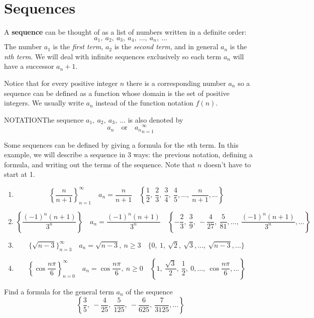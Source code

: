 \section{Sequences}
  A \textbf{sequence} can be thought of as a list of numbers written in a definite order:
  $$a_1,\ a_2,\ a_3,\ a_4,\ \ldots,\ a_n,\ \ldots$$
  The number $a_1$ is the \textit{first term}, $a_2$ is the \textit{second term}, and in general $a_n$ is the \textit{nth term}. We will deal with infinite sequences exclusively so each term $a_n$ will have a successor $a_n+1$.\par
  Notice that for every positive integer $n$ there is a corresponding number $a_n$ so a sequence can be defined as a function whose domain is the set of positive integers. We usually write $a_n$ instead of the function notation $f(n)$.
  \begin{center}
  \uppercase{Notation}\quad The sequence ${a_1,\ a_2,\ a_3,\ \ldots}$ is also denoted by
  $${a_n}\quad \text{or}\quad {a_n}_{n=1}^{\infty}$$
  \end{center}
  \begin{example}
    Some sequences can be defined by giving a formula for the \textit{n}th term. In this example, we will describe a sequence in 3 ways: the previous notation, defining a formula, and writing out the terms of the sequence. Note that $n$ doesn't have to start at 1.
    \begin{enumerate}
      \item $$\left\{\frac{n}{n+1}\right\}_{n=1}^{\infty} \quad a_n=\frac{n}{n+1}\quad \left\{\frac{1}{2},\ \frac{2}{3},\ \frac{3}{4},\ \frac{4}{5},\ldots,\ \frac{n}{n+1},\ldots\right\}$$
      \item $$\left\{\frac{(-1)^n (n+1)}{3^n}\right\} \quad a_n=\frac{(-1)^n (n+1)}{3^n}\quad \left\{-\frac{2}{3},\ \frac{3}{9},\ -\frac{4}{27},\ \frac{5}{81},\ldots,\ \frac{(-1)^n (n+1)}{3^n},\ldots\right\}$$
      \item $$\{\sqrt{n-3}\}_{n=3}^{\infty} \quad a_n=\sqrt{n-3},\ n\geq3 \quad \{0,\ 1,\ \sqrt{2},\ \sqrt{3},\ldots,\ \sqrt{n-3},\ldots\}$$
      \item $$\left\{\cos{\frac{n\pi}{6}}\right\}_{n=0}^{\infty} \quad a_n=\cos{\frac{n\pi}{6}},\ n\geq0 \quad \left\{1,\ \frac{\sqrt{3}}{2},\ \frac{1}{2},\ 0,\ldots,\ \cos{\frac{n\pi}{6}},\ldots\right\}$$
    \end{enumerate}
  \end{example}
  \begin{example}
    Find a formula for the general term $a_n$ of the sequence $$\left\{\frac{3}{5},\ -\frac{4}{25},\ \frac{5}{125},\ -\frac{6}{625},\ \frac{7}{3125},\ldots\right\}$$
  \end{example}
